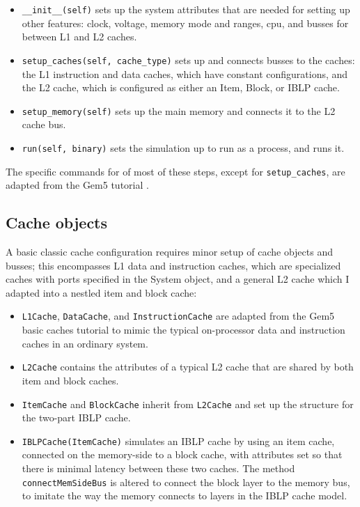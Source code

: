\documentclass[12pt,twoside]{reedthesis}
\begin{document}
	\begin{itemize}
		\item \verb`__init__(self)` sets up the system attributes that are needed for setting up other features: clock, voltage, memory mode and ranges, cpu, and busses for between L1 and L2 caches.
	
		\item \verb`setup_caches(self, cache_type)` sets up and connects busses to the caches: the L1 instruction and data caches, which have constant configurations, and the L2 cache, which is configured as either an Item, Block, or IBLP cache.
	
		\item \verb`setup_memory(self)` sets up the main memory and connects it to the L2 cache bus.
	
		\item \verb`run(self, binary)` sets the simulation up to run as a process, and runs it.
	\end{itemize}

	The specific commands for of most of these steps, except for \verb`setup_caches`, are adapted from the Gem5 tutorial \cite{gem5-tutorial}.

	\subsection*{Cache objects}

	A basic classic cache configuration requires minor setup of cache objects and busses; this encompasses L1 data and instruction caches, which are specialized caches with ports specified in the System object, and a general L2 cache which I adapted into a nestled item and block cache:

	\begin{itemize}
		\item \verb`L1Cache`, \verb`DataCache`, and \verb`InstructionCache` are adapted from the Gem5 basic caches tutorial to mimic the typical on-processor data and instruction caches in an ordinary system.
	
		\item \verb`L2Cache` contains the attributes of a typical L2 cache that are shared by both item and block caches.
	
		\item \verb`ItemCache` and \verb`BlockCache` inherit from \verb`L2Cache` and set up the structure for the two-part IBLP cache.
	
		\item \verb`IBLPCache(ItemCache)` simulates an IBLP cache by using an item cache, connected on the memory-side to a block cache, with attributes set so that there is minimal latency between these two caches. The method \verb`connectMemSideBus` is altered to connect the block layer to the memory bus, to imitate the way the memory connects to layers in the IBLP cache model.
	\end{itemize}
\end{document}
